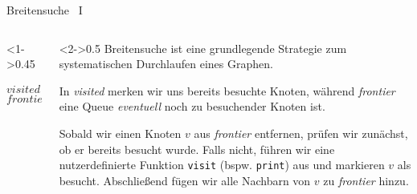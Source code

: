 \begin{frame}{Breitensuche \, I}
\begin{columns}[T]
\begin{column}<1->{0.45\textwidth}
\vspace*{-5pt}
\begin{algorithm}[H]
	\caption{Breitensuche (BFS)}
	\label{trees:alg:bfs}
	\vspace*{-6pt}
	\DontPrintSemicolon
    $visited \gets \emptyset$\;
    $frontier \gets \{ p \}$\;
\end{algorithm}
\end{column}
\begin{column}<2->{0.5\textwidth}
Breitensuche ist eine grundlegende Strategie zum systematischen Durchlaufen eines Graphen.

\medskip

In \emph{visited} merken wir uns bereits besuchte Knoten, w\"ahrend \emph{frontier} eine \alert{Queue} \emph{eventuell} noch zu besuchender Knoten ist.

\medskip

Sobald wir einen Knoten $v$ aus \emph{frontier} entfernen, pr\"ufen wir zun\"achst, ob er bereits besucht wurde.
Falls nicht, f\"uhren wir eine nutzerdefinierte Funktion \texttt{visit} (bspw. \texttt{print}) aus und markieren $v$ als besucht.
Abschlie{\ss}end f\"ugen wir alle Nachbarn von $v$ zu \emph{frontier} hinzu.
\end{column}
\end{columns}
\end{frame}

